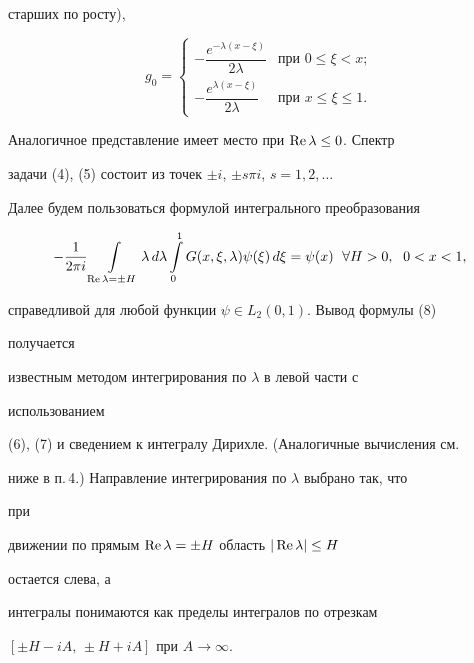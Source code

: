 старших по росту), 


\begin{equation} 


g_0= 


\begin{cases} 


-\dfrac{e^{-\lambda(x-\xi)}}{2\lambda}&\text{при }0\le\xi<x;\\ 


-\dfrac{e^{\lambda(x-\xi)}}{2\lambda}&\text{при }x\le\xi\le 1. 


\end{cases} 


\end{equation} 


Аналогичное представление имеет место при $\operatorname{Re}\lambda\le 0$. Спектр 


задачи (4), (5) состоит из точек $\pm i$, $\pm s\pi i$, $s=1,2,\dotsc$ 


 


Далее будем пользоваться формулой интегрального преобразования 


\begin{equation} 


-\frac{1}{2\pi i}\intl_{\re\lambda=\pm H}\lambda\,d\lambda 


\intl^1_0 G(x,\xi,\lambda)\psi(\xi)\,d\xi=\psi(x) 


\ \;\forall H>0,\ \;0<x<1, 


\end{equation} 


справедливой для любой функции $\psi\in L_2(0,1)$. Вывод формулы (8) 


получается 


известным методом интегрирования по $\lambda$ в левой части с 


использованием 


(6), (7) и сведением к интегралу Дирихле. (Аналогичные вычисления см. 


ниже в п.\,4.) Направление интегрирования по $\lambda$ выбрано так, что 


при 


движении по прямым $\operatorname{Re}\lambda=\pm H$ область $|\operatorname{Re}\lambda|\le H$ 


остается слева, а 


интегралы понимаются как пределы интегралов по отрезкам 


$[\pm H-i A,\,\pm H+i A]$ при $A\to\infty$. 


